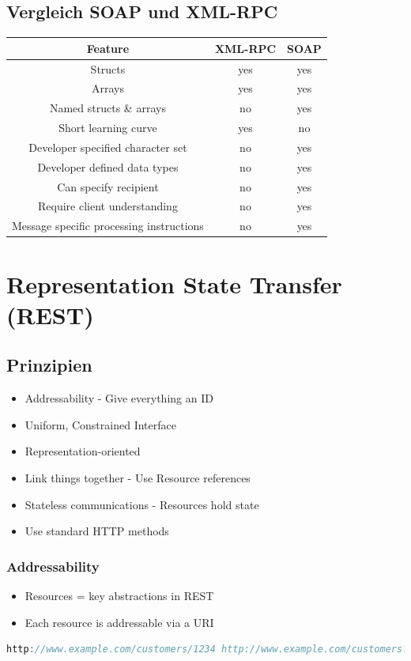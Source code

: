 \documentclass[10pt]{article}
\begin{document}
\subsection{Vergleich SOAP und XML-RPC}
\begin{tabular}{|c|c|c|}
\hline 
Feature & XML-RPC & SOAP \\ 
\hline
Structs & yes & yes \\ 
\hline 
Arrays & yes & yes \\ 
\hline 
Named structs \& arrays & no & yes \\ 
\hline 
Short learning curve & yes & no \\ 
\hline 
Developer specified character set & no & yes \\ 
\hline 
Developer defined data types & no & yes \\ 
\hline 
Can specify recipient & no & yes \\ 
\hline 
Require client understanding & no & yes \\ 
\hline 
Message specific processing instructions & no & yes \\ 
\hline  
\end{tabular} 

\newpage
\section{Representation State Transfer (REST)}
\subsection{Prinzipien}
\begin{itemize}
	\item Addressability - Give everything an ID
	\item Uniform, Constrained Interface
	\item Representation-oriented
	\item Link things together - Use Resource references
	\item Stateless communications - Resources hold state
	\item Use standard HTTP methods
\end{itemize}
\subsubsection{Addressability}
\begin{itemize}
	\item Resources = key abstractions in REST
	\item Each resource is addressable via a URI
\end{itemize}
\begin{lstlisting}[language=Java, caption=REST example, style=JavaStyle]
http://www.example.com/customers/1234 http://www.example.com/customers?lastName=Meier http://www.example.com/orders/2011/03/445245 http://www.example.com/products/ http://www.example.com/products/4711
\end{lstlisting}
\end{document}
